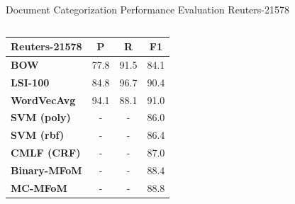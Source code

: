 \documentclass[10pt]{beamer}
\begin{document}
\begin{frame}{Document Categorization Performance Evaluation Reuters-21578 }
\begin{columns}[T]
	\hspace{5mm}
	\begin{column}{.4\textwidth}
		\begin{table}[h!]
		\tabcolsep=0.1cm
		\scriptsize
		\begin{center}
		\begin{tabular}{l@{\hskip8mm} c c@{\hskip4mm} c}
		\toprule
		\textbf{Reuters-21578} & {P} & {R} & \textbf{F1} \\
		\midrule
		\textbf{BOW}
		& 77.8   & 91.5  & 84.1 \\
		\textbf{LSI-100}
		& 84.8   & 96.7  & 90.4 \\
		\textbf{WordVecAvg}
		& 94.1   & 88.1  & 91.0 \\ \addlinespace[1mm]

		\textbf{SVM (poly)} \cite{joachims1998text}
		& -   & -  & 86.0 \\
		\textbf{SVM (rbf)} \cite{joachims1998text}
		& -   & -  & 86.4 \\ 
		\textbf{CMLF (CRF)} \cite{ghamrawi2005collective}
		& -   & -  & 87.0 \\
		\textbf{Binary-MFoM} \cite{gao2004mfom}
		& -   & -  & 88.4 \\ 
		\textbf{MC-MFoM} \cite{gao2004mfom}
		& -   & -  & 88.8 \\ 


\end{tabular}
\end{center}
\end{table}
\end{column}
\end{columns}
\end{frame}
\end{document}
